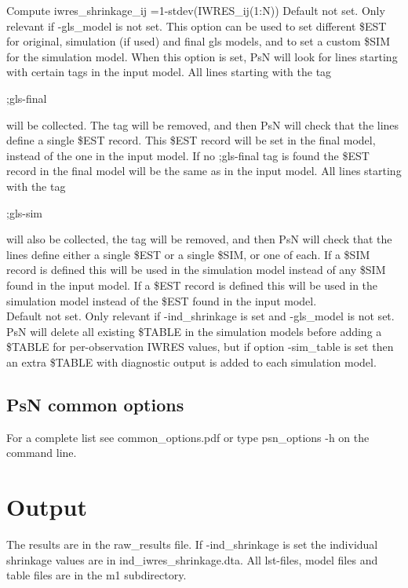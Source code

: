 \begin{optionlist}
Compute iwres\_shrinkage\_ij =1-stdev(IWRES\_ij(1:N))
\nextopt
{}
Default not set. Only relevant if -gls\_model is not set. This option can be used to set different \$EST for original, simulation (if used) and final gls 
models, and to set a custom \$SIM for the simulation model. When this option is set, PsN will look for lines starting with certain tags in the input model. 
All lines starting with the tag

;gls-final

will be collected. The tag will be removed, and then PsN will check that the lines define a single \$EST record. This \$EST record will be set in the final 
model, instead of the one in the input model. If no ;gls-final tag is found the \$EST record in the final model will be the same as in the input model. 
All lines starting with the tag

;gls-sim

will also be collected, the tag will be removed, and then PsN will check that the lines define either a single \$EST or a single \$SIM, or one of each. 
If a \$SIM record is defined this will be used in the simulation model instead of any \$SIM found in the input model. If a \$EST record is defined this 
will be used in the simulation model instead of the \$EST found in the input model.\\
\nextopt
{}
Default not set. Only relevant if -ind\_shrinkage is set and -gls\_model is not set. PsN will delete all existing \$TABLE in the simulation models before 
adding a \$TABLE for per-observation IWRES values, but if option -sim\_table is set then an extra \$TABLE with diagnostic output is added to each 
simulation model. 
\nextopt
\end{optionlist}

\subsection{PsN common options}
For a complete list see common\_options.pdf or type psn\_options -h on the command line.

\section{Output}

The results are in the raw\_results file. If -ind\_shrinkage is set the individual shrinkage values are in ind\_iwres\_shrinkage.dta. All lst-files, model files and table files are in the m1 subdirectory.

